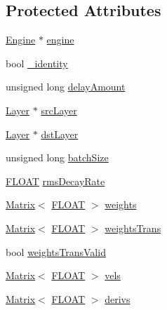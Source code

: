 \subsection*{Protected Attributes}
\begin{DoxyCompactItemize}
\item 
\hyperlink{classfractal_1_1Engine}{Engine} $\ast$ \hyperlink{classfractal_1_1Connection_aed0a390a46ba6bcdff5c6238ac5b9bda}{engine}
\item 
bool \hyperlink{classfractal_1_1Connection_aabe650cd29a9133e18de1a99bafd2069}{\+\_\+identity}
\item 
unsigned long \hyperlink{classfractal_1_1Connection_aeed56c0faa379d9c695e49457b63bc03}{delay\+Amount}
\item 
\hyperlink{classfractal_1_1Layer}{Layer} $\ast$ \hyperlink{classfractal_1_1Connection_a79a17a00d69083b24cd9ebcb11555952}{src\+Layer}
\item 
\hyperlink{classfractal_1_1Layer}{Layer} $\ast$ \hyperlink{classfractal_1_1Connection_a43d6bb6d604142602b3e339bb77bda33}{dst\+Layer}
\item 
unsigned long \hyperlink{classfractal_1_1Connection_a1c06df140701c272107c47b4ce40792b}{batch\+Size}
\item 
\hyperlink{namespacefractal_a1c2d2530689575d5ccb56bae52af70d3}{F\+L\+O\+A\+T} \hyperlink{classfractal_1_1Connection_ade0067c963f876032c92cd4198deaa32}{rms\+Decay\+Rate}
\item 
\hyperlink{classfractal_1_1Matrix}{Matrix}$<$ \hyperlink{namespacefractal_a1c2d2530689575d5ccb56bae52af70d3}{F\+L\+O\+A\+T} $>$ \hyperlink{classfractal_1_1Connection_a44f908ab921162e57108b5b6854e2ab0}{weights}
\item 
\hyperlink{classfractal_1_1Matrix}{Matrix}$<$ \hyperlink{namespacefractal_a1c2d2530689575d5ccb56bae52af70d3}{F\+L\+O\+A\+T} $>$ \hyperlink{classfractal_1_1Connection_a1df1793ca8ec947b29841138023e4ce7}{weights\+Trans}
\item 
bool \hyperlink{classfractal_1_1Connection_a22c55c2a935e38469f00cd7502d5bb0f}{weights\+Trans\+Valid}
\item 
\hyperlink{classfractal_1_1Matrix}{Matrix}$<$ \hyperlink{namespacefractal_a1c2d2530689575d5ccb56bae52af70d3}{F\+L\+O\+A\+T} $>$ \hyperlink{classfractal_1_1Connection_ae56d3a80cde5f872b18e11a9e087a335}{vels}
\item 
\hyperlink{classfractal_1_1Matrix}{Matrix}$<$ \hyperlink{namespacefractal_a1c2d2530689575d5ccb56bae52af70d3}{F\+L\+O\+A\+T} $>$ \hyperlink{classfractal_1_1Connection_a31f6cf9d89d0c4166dc8bde044fafd00}{derivs}

\end{DoxyCompactItemize}
